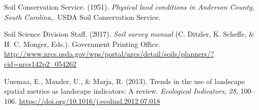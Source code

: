 \documentclass[
  letterpaper,
  DIV=11,
  numbers=noendperiod]{scrartcl}
\newlength{\cslhangindent}
\newlength{\cslentryspacingunit} %
\newenvironment{CSLReferences}[2] %
 {%
  \setlength{\parindent}{0pt}
  \ifodd #1
  \let\oldpar\par
  \def\par{\hangindent=\cslhangindent\oldpar}
  \fi
  \setlength{\parskip}{#2\cslentryspacingunit}
 }%
 {}
\begin{document}
\begin{CSLReferences}{1}{0}
\leavevmode{}%
Soil Conservation Service. (1951). \emph{Physical land conditions in
{Anderson County}, {South Carolina},}. {USDA Soil Conservation Service}.

\leavevmode{}%
Soil Science Division Staff. (2017). \emph{Soil survey manual} (C.
Ditzler, K. Scheffe, \& H. C. Monger, Eds.). {Government Printing
Office}.
\url{http://www.nrcs.usda.gov/wps/portal/nrcs/detail/soils/planners/?cid=nrcs142p2_054262}

\leavevmode{}%
Uuemaa, E., Mander, U., \& Marja, R. (2013). Trends in the use of
landscape spatial metrics as landscape indicators: {A} review.
\emph{Ecological Indicators}, \emph{28}, 100--106.
\url{https://doi.org/10.1016/j.ecolind.2012.07.018}

\end{CSLReferences}
\end{document}
